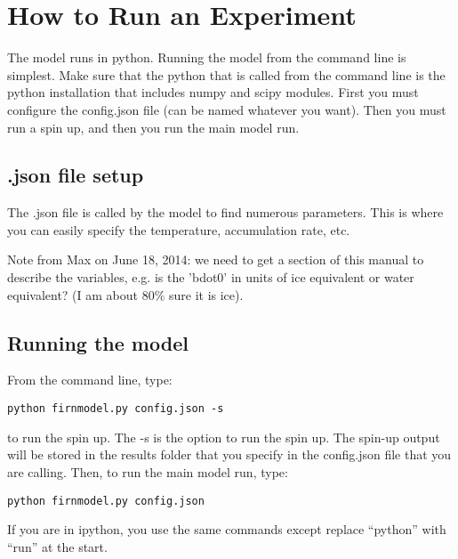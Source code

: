 \documentclass{article}
\begin{document}
\section{How to Run an Experiment}

The model runs in python. Running the model from the command line is simplest. Make sure that the python that is called from the command line is the python installation that includes numpy and scipy modules. First you must configure the config.json file (can be named whatever you want). Then you must run a spin up, and then you run the main model run. 

\subsection{.json file setup}

The .json file is called by the model to find numerous parameters. This is where you can easily specify the temperature, accumulation rate, etc. 

Note from Max on June 18, 2014: we need to get a section of this manual to describe the variables, e.g. is the 'bdot0' in units of ice equivalent or water equivalent? (I am about 80\% sure it is ice).

\subsection{Running the model}
From the command line, type:

\begin{verbatim}
python firnmodel.py config.json -s
\end{verbatim}

to run the spin up. The -s is the option to run the spin up. The spin-up output will be stored in the results folder that you specify in the config.json file that you are calling. Then, to run the main model run, type:

\begin{verbatim}
python firnmodel.py config.json
\end{verbatim}

If you are in ipython, you use the same commands except replace ``python'' with ``run'' at the start. 
\end{document}
